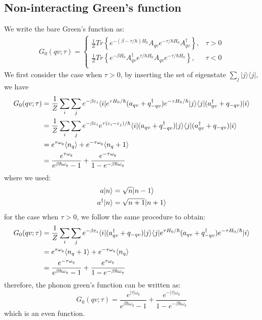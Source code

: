 \documentclass{article}
\begin{document}
\subsection*{Non-interacting Green's function}
We write the bare Green's function as:
\begin{align}
    G_0(qv;\tau) = 
    \begin{cases}
        \frac{1}{Z} Tr\left\{ e^{-(\beta-\tau/\hbar)H_0} A_{qv} e^{-\tau/\hbar H_0} A_{qv}^{\dagger} \right\}, &\tau > 0 \\
        \frac{1}{Z} Tr\left\{ e^{-\beta H_0} A_{qv}^{\dagger} e^{\tau/\hbar H_0} A_{qv} e^{- \tau/\hbar H_0} \right\}, &\tau < 0 \\
    \end{cases}
\end{align}
We first consider the case when $\tau > 0$, by inserting the set of eigenstate $\sum_j |j\rangle \langle j | $, we have
\begin{align}
    G_0(qv;\tau) &= \frac{1}{Z} \sum_i \sum_j e^{-\beta \varepsilon_i} \langle i | e^{\tau H_0/\hbar} (a_{qv} + q_{-qv}^{\dagger}) e^{-\tau H_0/\hbar} | j \rangle 
                        \langle j | (a_{qv}^{\dagger} + q_{-qv}) | i \rangle  \notag \\
                &= \frac{1}{Z} \sum_i \sum_j e^{-\beta \varepsilon_i} e^{\tau(\varepsilon_i - \varepsilon_j)/\hbar} 
                \langle i | (a_{qv} + q_{-qv}^{\dagger}) | j \rangle \langle j | (a_{qv}^{\dagger} + q_{-qv}) | i \rangle  \notag \\
                &= e^{\tau \omega_q} \langle n_q \rangle + e^{- \tau \omega_q}  \langle n_q  + 1\rangle \notag \\
                &= \frac{e^{\tau \omega_q}}{e^{\beta \hbar \omega_q} - 1} + \frac{e^{-\tau \omega_q}}{1 - e^{-\beta \hbar \omega_q} }
\end{align}
where we used:
\begin{align}
    a | n \rangle &= \sqrt{n} | n-1 \rangle  \notag \\
    a^{\dagger} | n \rangle &= \sqrt{n+1} | n+1 \rangle \notag \\
\end{align}
for the case when $\tau > 0$, we follow the same procedure to obtain:
\begin{align}
    G_0(qv;\tau) &= \frac{1}{Z} \sum_i \sum_j e^{-\beta \varepsilon_i} \langle i | (a_{qv}^{\dagger} + q_{-qv}) | j \rangle
                        \langle j | e^{\tau H_0/\hbar} (a_{qv} + q_{-qv}^{\dagger}) e^{-\tau H_0/\hbar} | i \rangle  \notag \\
                &= e^{\tau \omega_q} \langle n_q + 1\rangle + e^{- \tau \omega_q} \langle n_q \rangle \notag \\
                &= \frac{e^{- \tau \omega_q}}{e^{\beta \hbar \omega_q} - 1} + \frac{e^{\tau \omega_q}}{1 - e^{-\beta \hbar \omega_q} }
\end{align}
therefore, the phonon green's function can be written as:
\begin{equation}
    G_0(qv;\tau) = \frac{e^{|\tau| \omega_q}}{e^{\beta \hbar \omega_q} - 1} + \frac{e^{-|\tau| \omega_q}}{1 - e^{-\beta \hbar \omega_q} }
\end{equation}
which is an even function.
\end{document}
